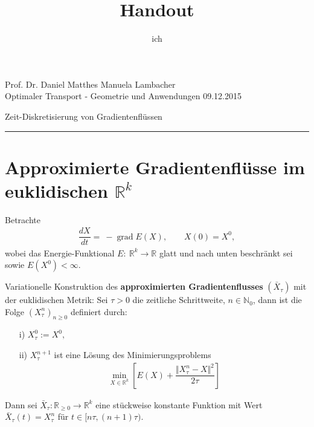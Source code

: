 \documentclass[11pt,a4paper,notitlepage]{scrreprt}
\author{ich}
\title{Handout}
\newcommand{\RR}{\mathbb{R}}
\newcommand{\NN}{\mathbb{N}}
\newcommand{\grad}{\operatorname{grad}}
\begin{document}
\parindent 0pt



\pagestyle{empty}



 Prof. Dr. Daniel Matthes \hfill Manuela Lambacher\\
 Optimaler Transport - Geometrie und Anwendungen \hfill 09.12.2015
 \begin{center}
  {\huge{Zeit-Diskretisierung von Gradientenflüssen}} 
 \end{center}
 \vspace{4pt}
 \hrule
 
\renewcommand{\thechapter}{\arabic{section}}
\renewcommand{\thesection}{\arabic{section}}
\section{Approximierte Gradientenflüsse im euklidischen $\RR^k$}

Betrachte \begin{eqnarray}
\dfrac{dX}{dt}=~-\grad E(X),~~~~~~~~~X(0)=X^0, \label{eq1}
\end{eqnarray} wobei das Energie-Funktional $E:~\RR^k\to\RR$ glatt und nach unten beschränkt sei sowie ${E(X^0)<\infty}$. 
\vspace{14pt}

Variationelle Konstruktion des \textbf{approximierten Gradientenflusses} $(\bar{X}_\tau)$ mit der euklidischen Metrik:\newline
Sei $\tau > 0$ die zeitliche Schrittweite, $n\in\NN_0$, dann ist die Folge $\left( X^n_\tau \right)_{n\geq 0}$ definiert durch:
\begin{itemize}
\item[i)]$X_\tau^0:=X^0,$
\item[ii)]$X_\tau^{n+1}$ ist eine Lösung des Minimierungsproblems
\begin{eqnarray}
\min_{X\in\RR^k}\left[E(X)+\dfrac{\Vert X_\tau^n-X\Vert^2}{2\tau}\right] \label{Min}
\end{eqnarray}
\end{itemize}
Dann sei $\bar{X}_\tau:\RR_{\geq0}\to\RR^k$ eine stückweise konstante Funktion mit Wert $\bar{X}_\tau(t)=X^n_\tau$ für ${t\in [n\tau,(n+1)\tau)}$. 

\vspace{12pt}
\end{document}
